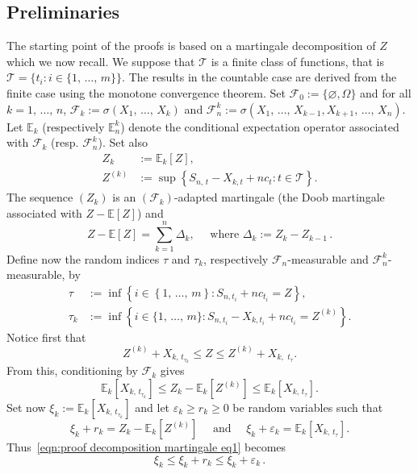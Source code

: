\documentclass[10pt]{amsart}
\theoremstyle{definition}\newtheorem{defi}[theo]{Definition}\newtheorem{rema}[theo]{Remark}\newtheorem{exam}[theo]{Example}\newtheorem{exem}[theo]{Example}\newtheorem{nota}[theo]{Notation}
\newcommand{\bE}{\mathbb{E}}
\newcommand{\cF}{\mathcal{F}}
\newcommand{\cT}{\mathcal{T}}
\begin{document}
\subsection{Preliminaries}
The starting point of the proofs is based on a martingale decomposition of $Z$ which we now recall. We suppose that $\cT$ is a finite class of functions, that is $\cT=\{t_i : i\in\{1,\,\ldots,\,m\}\}$. The results in the countable case are derived from the finite case using the monotone convergence theorem. Set $\cF_0:=\{\varnothing,\Omega\}$ and for all $k=1,\,\ldots,\,n$, $\cF_k:=\sigma(X_1,\,\ldots, \,X_k)$ and $\cF_n^k:=\sigma(X_1,\,\ldots,\,X_{k-1},X_{k+1},\,\ldots,\,X_n)$. Let $\bE_k$ (respectively $\bE_n^k$) denote the conditional expectation operator associated with $\cF_k$ (resp. $\cF^k_n$). Set also
\begin{align}
Z_k&:=\bE_k[Z],\\
Z^{(k)}&:=\sup\left\{S_{n,\,t}-X_{k,t}+nc_t : t\in\cT\right\}. \label{eqn:def Z^k}
\end{align}
The sequence $(Z_k)$ is an $(\cF_k)$-adapted martingale (the Doob martingale associated with $Z-\bE[Z]$) and
\begin{equation}\label{eqn:decomposition Doob Z}
Z-\bE[Z]=\sum_{k=1}^n \Delta_k,\quad \text{ where }\Delta_k:=Z_k-Z_{k-1}\,.
\end{equation}
Define now the random indices $\tau$ and $\tau_k$, respectively $\cF_n$-measurable and $\cF_n^k$-measurable, by
\begin{align}
\tau &:=\inf\left\{i\in\left\{1,\,\ldots,\,m\right\} : S_{n,t_i}+nc_{t_i}=Z\right\},\\
\tau_k &:=\inf\left\{i\in\{1,\,\ldots,\,m\} : S_{n,t_i}-X_{k,t_i}+nc_{t_i}=Z^{(k)}\right\}.
\end{align}
Notice first that
\[
Z^{(k)}+X_{k,\,t_{\tau_k}}\leq Z\leq Z^{(k)}+X_{k,\,\,t_\tau}.
\]
From this, conditioning by $\cF_k$ gives
\begin{equation}\label{eqn:proof decomposition martingale eq1}
\bE_k\left[X_{k,\,t_{\tau_k}}\right]\leq Z_k-\bE_k\left[Z^{(k)}\right]\leq\bE_k\left[X_{k,\,t_\tau}\right].
\end{equation}
Set now $\xi_k:=\bE_k[X_{k,\,t_{\tau_k}}]$ and let $\varepsilon_k\geq r_k\geq 0$ be random variables such that
\[
\xi_k+r_k=Z_k-\bE_k\left[Z^{(k)}\right]\quad\text{ and }\quad \xi_k+\varepsilon_k=\bE_k\left[X_{k,\,t_\tau}\right].
\]
Thus~\eqref{eqn:proof decomposition martingale eq1} becomes
\begin{equation}\label{eqn:proof decomposition martingale eq2}
\xi_k\leq\xi_k+ r_k\leq \xi_k+\varepsilon_k\,.
\end{equation}
\end{document}
